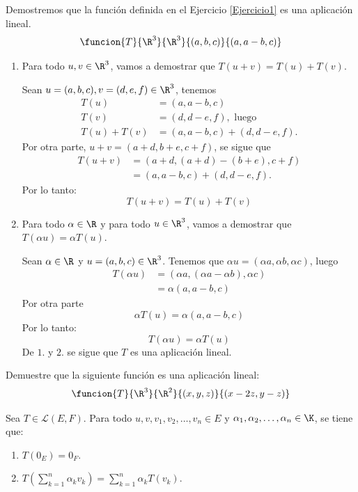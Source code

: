 \documentclass[compacto,10pt]{pubciencias-notas}
\begin{document}
\begin{ejem}
Demostremos que la función definida en el Ejercicio \ref{Ejercicio1} es una aplicación lineal.
\[
    \funcion{T}{\R^3}{\R^3}{(a,b,c)}{(a,a-b,c)}
\]
\begin{enumerate}
\item
    Para todo $u, v \in \R^{3}$, vamos a demostrar que $T(u+v) = T(u) + T(v)$.

    \noindent Sean $u = (a, b, c), v = (d, e, f) \in \R^{3}$, tenemos
    \begin{align*}
        T(u) & = (a,a-b,c) \\
        T(v) & = (d,d-e,f), \text{ luego} \\
        T(u) + T(v) & = (a,a-b,c) + (d,d-e,f).
    \end{align*}
    Por otra parte, $u+v = (a+d, b+e, c+f)$, se sigue que
    \begin{align*}
        T(u+v) & = (a + d,(a+d) - (b+e), c+f) \\
        & = (a,a-b, c) + (d,d-e,f).
    \end{align*}
    Por lo tanto:
    \[
        T(u+v) = T(u) + T(v)
    \]
    
\item
    Para todo $\alpha \in \R$ y para todo $u \in \R^{3}$, vamos a demostrar que $T(\alpha u) = \alpha T(u)$.
    
    Sean $\alpha \in \R$ y $u = (a, b, c) \in \R^{3}$. 
    Tenemos que $\alpha u = (\alpha a, \alpha b, \alpha c)$, luego
    \begin{align*}
    T(\alpha u) & = (\alpha a,(\alpha a - \alpha b) , \alpha c) \\
    & = \alpha (a, a-b, c)
    \end{align*}
    Por otra parte
    \[
        \alpha T(u) = \alpha (a ,a-b,c)
    \]
    Por lo tanto:
    \[
        T(\alpha u) = \alpha T(u)
    \]
    De $1.$ y $2.$ se sigue que $T$ es una aplicación lineal.
\end{enumerate}
\end{ejem}

\begin{ejer} 
Demuestre que la siguiente función es una aplicación lineal:
   \[
        \funcion{T}{\R^3}{\R^2}{(x,y,z)}{(x-2z,y-z)}
    \]
\end{ejer}

\begin{teo}
     Sea $T \in \mathscr{L}(E,F)$. Para todo $u,v, v_1, v_2, \ldots, v_n \in E$ y $\alpha_1, \alpha_2, \ldots, \alpha_n \in \K$, se tiene que:
     \begin{enumerate}
         \item $T(0_E) = 0_F$.
         \item $T\left(\displaystyle \sum_{k=1}^n \alpha_k v_k \right)= 
         \displaystyle \sum_{k=1}^n \alpha_k T\left(v_k \right)$.
     \end{enumerate}
\end{teo}
\end{document}
